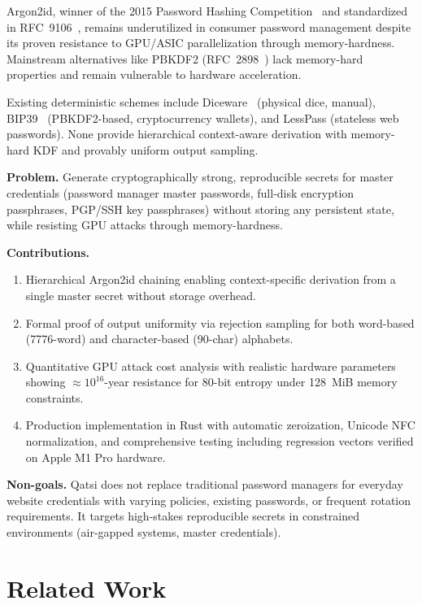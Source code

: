 \documentclass[11pt]{article}
\begin{document}
Argon2id, winner of the 2015 Password Hashing Competition~\cite{phc-2015} and standardized in RFC~9106~\cite{rfc9106}, remains underutilized in consumer password management despite its proven resistance to GPU/ASIC parallelization through memory-hardness. Mainstream alternatives like PBKDF2 (RFC~2898~\cite{rfc2898}) lack memory-hard properties and remain vulnerable to hardware acceleration.

Existing deterministic schemes include Diceware~\cite{diceware} (physical dice, manual), BIP39~\cite{bip39} (PBKDF2-based, cryptocurrency wallets), and LessPass (stateless web passwords). None provide hierarchical context-aware derivation with memory-hard KDF and provably uniform output sampling.

\textbf{Problem.} Generate cryptographically strong, reproducible secrets for master credentials (password manager master passwords, full-disk encryption passphrases, PGP/SSH key passphrases) without storing any persistent state, while resisting GPU attacks through memory-hardness.

\textbf{Contributions.}
\begin{enumerate}
\item Hierarchical Argon2id chaining enabling context-specific derivation from a single master secret without storage overhead.
\item Formal proof of output uniformity via rejection sampling for both word-based (7776-word) and character-based (90-char) alphabets.
\item Quantitative GPU attack cost analysis with realistic hardware parameters showing $\approx 10^{16}$-year resistance for 80-bit entropy under 128~MiB memory constraints.
\item Production implementation in Rust with automatic zeroization, Unicode NFC normalization, and comprehensive testing including regression vectors verified on Apple M1 Pro hardware.
\end{enumerate}

\textbf{Non-goals.} Qatsi does not replace traditional password managers for everyday website credentials with varying policies, existing passwords, or frequent rotation requirements. It targets high-stakes reproducible secrets in constrained environments (air-gapped systems, master credentials).

\section{Related Work}
\end{document}
